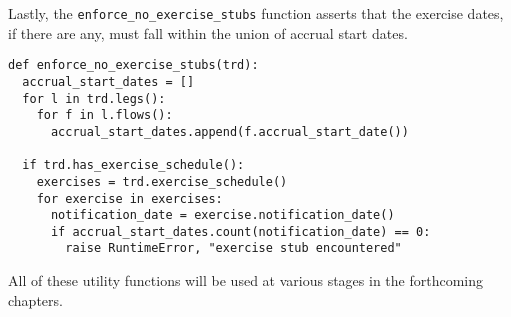 Lastly, the \verb|enforce_no_exercise_stubs| function asserts that the
exercise dates, if there are any, must fall within the union of
accrual start dates.
\begin{verbatim}
def enforce_no_exercise_stubs(trd):
  accrual_start_dates = []
  for l in trd.legs():
    for f in l.flows():
      accrual_start_dates.append(f.accrual_start_date())

  if trd.has_exercise_schedule():
    exercises = trd.exercise_schedule()
    for exercise in exercises:
      notification_date = exercise.notification_date()        
      if accrual_start_dates.count(notification_date) == 0:
        raise RuntimeError, "exercise stub encountered"        
\end{verbatim}
All of these utility functions will be used at various stages in the
forthcoming chapters.
